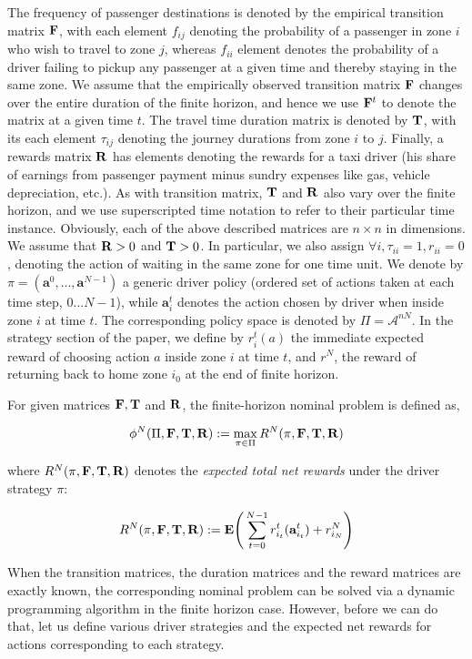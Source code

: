 The frequency of passenger destinations is denoted by the empirical transition matrix $\mathbf{F}$, with each element $f_{ij}$ denoting the probability of a passenger in zone $i$ who wish to travel to zone $j$, whereas $f_{ii}$ element denotes the probability of a driver failing to pickup any passenger at a given time and thereby staying in the same zone. We assume that the empirically observed transition matrix $\mathbf{F}$ changes over the entire duration of the finite horizon, and hence we use $\mathbf{F}^{t}$ to denote the matrix at a given time $t$. The travel time duration matrix is denoted by $\mathbf{T}$, with its each element $\tau_{ij}$ denoting the journey durations from zone $i$ to $j$. Finally, a rewards matrix $\mathbf{R}$ has elements denoting the rewards for a taxi driver (his share of earnings from passenger payment minus sundry expenses like gas, vehicle depreciation, etc.). As with transition matrix, $\mathbf{T}$ and $\mathbf{R}$ also vary over the finite horizon, and we use superscripted time notation to refer to their particular time instance. Obviously, each of the above described matrices are $n \times n$ in dimensions. We assume that $\mathbf{R} > 0$ and $\mathbf{T} > 0$. In particular, we also assign $\forall i, \tau_{ii}=1, r_{ii}=0$, denoting the action of waiting in the same zone for one time unit. We denote by $\pi =(\textbf{a}^0, \dots, \textbf{a}^{N-1})$ a generic driver policy (ordered set of actions taken at each time step, $0 \dots N-1$), while $\textbf{a}_{i}^{t}$ denotes the action chosen by driver when inside zone $i$ at time $t$. The corresponding policy space is denoted by $\Pi = \mathcal{A}^{nN}$. In the strategy section of the paper, we define by $r_{i}^{t}(a)$ the immediate expected reward of choosing action $a$ inside zone $i$ at time $t$, and $r^{N}$, the reward of returning back to home zone $i_0$ at the end of finite horizon.

For given matrices $\mathbf{F}, \mathbf{T}$ and $\mathbf{R}$, the finite-horizon nominal problem is defined as,

\begin{eqnarray}
\phi^{N}(\Pi, \mathbf{F}, \mathbf{T}, \mathbf{R}) := \max_{\pi \in \Pi} R^{N}(\pi, \mathbf{F}, \mathbf{T}, \mathbf{R})
\end{eqnarray}

where $R^{N}(\pi, \mathbf{F}, \mathbf{T}, \mathbf{R})$ denotes the \textit{expected total net rewards} under the driver strategy $\pi$:

\begin{eqnarray}
R^{N}(\pi, \mathbf{F}, \mathbf{T}, \mathbf{R}) := \mathbf{E}\Bigg(\sum_{t=0}^{N-1}r_{i_t}^{t}(\textbf{a}_{i_t}^{t}) + r^{N}_{i_N}\Bigg)
\end{eqnarray}

When the transition matrices, the duration matrices and the reward matrices are exactly known, the corresponding nominal problem can be solved via a dynamic programming algorithm in the finite horizon case. However, before we can do that, let us define various driver strategies and the expected net rewards for actions corresponding to each strategy.